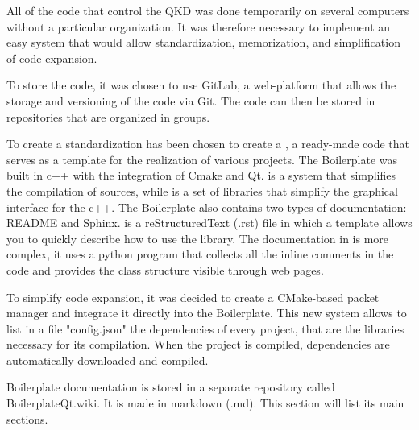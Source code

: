 All of the code that control the QKD was done temporarily on several computers without a particular organization. It was therefore necessary to implement an easy system that would allow standardization, memorization, and simplification of code expansion.

To store the code, it was chosen to use GitLab, a web-platform that allows the storage and versioning of the code via Git. The code can then be stored in repositories that are organized in groups.

To create a standardization has been chosen to create a , a ready-made code that serves as a template for the realization of various projects. The Boilerplate was built in c++ with the integration of Cmake and Qt.
 is a system that simplifies the compilation of sources, while  is a set of libraries that simplify the graphical interface for the c++. The Boilerplate also contains two types of documentation: README and Sphinx.
 is a reStructuredText (.rst) file in which a template allows you to quickly describe how to use the library.
The documentation in  is more complex, it uses a python program that collects all the inline comments in the code and provides the class structure visible through web pages.

To simplify code expansion, it was decided to create a CMake-based packet manager and integrate it directly into the Boilerplate. This new system allows to list in a file "config.json" the dependencies of every project, that are the libraries necessary for its compilation.
When the project is compiled, dependencies are automatically downloaded and compiled.

Boilerplate documentation is stored in a separate repository called BoilerplateQt.wiki. It is made in markdown (.md). This section will list its main sections.
  {\parindent0pt
    
    
    
    
    
    
  }
